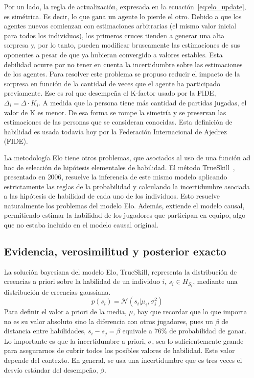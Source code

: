 \documentclass[a4paper,11pt]{book}
\newcommand{\N}{\mathcal{N}}
\theoremstyle{definition}
\begin{document}

Por un lado, la regla de actualizaci\'on, expresada en la ecuaci\'on~\eqref{eq:elo_update}, es sim\'etrica. 
Es decir, lo que gana un agente lo pierde el otro.
%
Debido a que los agentes nuevos comienzan con estimaciones arbitrarias (el mismo valor inicial para todos los individuos), los primeros cruces tienden a generar una alta sorpresa y, por lo tanto, pueden modificar bruscamente las estimaciones de sus oponentes a pesar de que ya hubieran convergido a valores estables.
%
Esta debilidad ocurre por no tener en cuenta la incertidumbre sobre las estimaciones de los agentes.
%
Para resolver este problema se propuso reducir el impacto de la sorpresa en funci\'on de la cantidad de veces que el agente ha participado previamente.
%
Ese es rol que desempe\~na el K-factor usado por la FIDE, $\Delta_i = \Delta \cdot K_i$.
%
A medida que la persona tiene m\'as cantidad de partidas jugadas, el valor de K es menor.
%
De esa forma se rompe la simetr\'ia y se preservan las estimaciones de las personas que se consideran conocidas.
%
Esta definici\'on de habilidad es usada todav\'ia hoy por la Federaci\'on Internacional de Ajedrez (FIDE).


La metodolog\'ia Elo tiene otros problemas, que asociados al uso de una funci\'on ad hoc de selecci\'on de hip\'otesis elementales de habilidad.
%
El m\'etodo TrueSkill~\cite{Herbrich2007,trueskill_patent_06, trueskill_patent_09}, presentado en 2006, resuelve la inferencia de este mismo modelo aplicando estrictamente las reglas de la probabilidad y calculando la incertidumbre asociada a las hip\'otesis de habilidad de cada uno de los individuos.
%
Esto resuelve naturalmente los problemas del modelo Elo.
%
Adem\'as, extiende el modelo causal, permitiendo estimar la habilidad de los jugadores que participan en equipo, algo que no estaba incluido en el modelo causal original.

\subsection{Evidencia, verosimilitud y posterior exacto} \label{sec:trueskill}

La soluci\'on bayesiana del modelo Elo, TrueSkill, representa la distribuci\'on de creencias a priori sobre la habilidad de un individuo $i$, $s_i \in H_{S_i}$, mediante una distribuci\'on de creencias gaussiana.
%
\begin{equation}
p(s_i) = \N(s_i | \mu_i, \sigma_i^2)
\end{equation}
%
Para definir el valor a priori de la media, $\mu$, hay que recordar que lo que importa no es su valor absoluto sino la diferencia con otros jugadores, pues un $\beta$ de distancia entre habilidades, $s_i-s_j=\beta$ equivale a 76\% de probabilidad de ganar.
%
Lo importante es que la incertidumbre a priori, $\sigma$, sea lo suficientemente grande para asegurarnos de cubrir todos los posibles valores de habilidad.
%
Este valor depende del contexto.
%
En general, se usa una incertidumbre que es tres veces el desv\'io est\'andar del desempe\~no, $\beta$.
\end{document}

